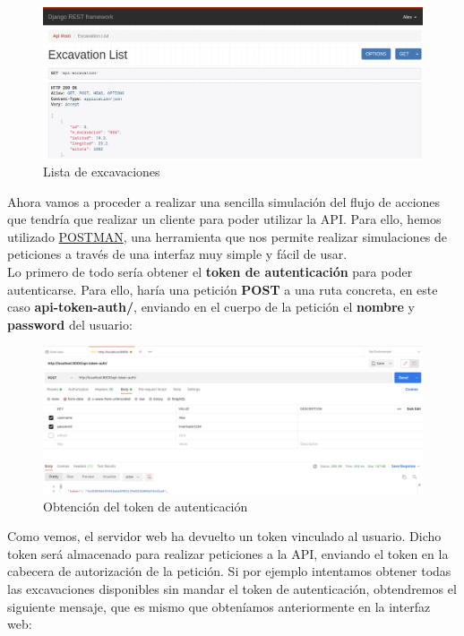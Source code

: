         \begin{figure}[H]
            \centering
            \includegraphics[scale=0.30]{imagenes/list-excavations.png}
            \caption{Lista de excavaciones}
            \label{fig:list-excavations}
        \end{figure}

Ahora vamos a proceder a realizar una sencilla simulación del flujo de acciones que tendría
que realizar un cliente para poder utilizar la API. Para ello, hemos utilizado
\href{https://www.postman.com/}{POSTMAN}, una herramienta que nos permite realizar
simulaciones de peticiones a través de una interfaz muy simple y fácil de usar.\\

Lo primero de todo sería obtener el \textbf{token de autenticación} para poder autenticarse.
Para ello, haría una petición \textbf{POST} a una ruta concreta, en este caso
\textbf{api-token-auth/}, enviando en el cuerpo de la petición el \textbf{nombre} y
\textbf{password} del usuario:

        \begin{figure}[H]
            \centering
            \includegraphics[scale=0.25]{imagenes/get-token.png}
            \caption{Obtención del token de autenticación}
            \label{fig:get-token}
        \end{figure}

Como vemos, el servidor web ha devuelto un token vinculado al usuario. Dicho token será
almacenado para realizar peticiones a la API, enviando el token en la cabecera de
autorización de la petición. Si por ejemplo intentamos obtener todas las excavaciones
disponibles sin mandar el token de autenticación, obtendremos el siguiente mensaje, que es
mismo que obteníamos anteriormente en la interfaz web:

